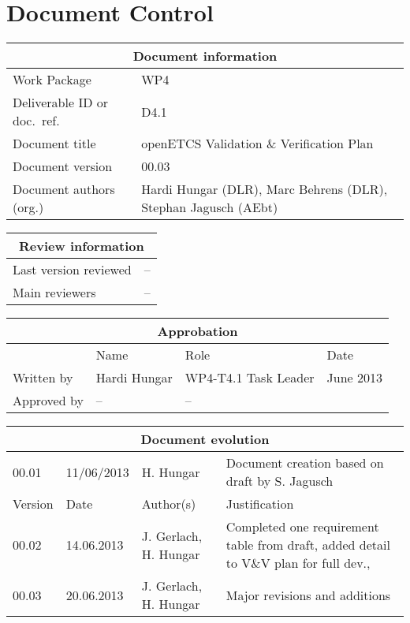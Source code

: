\documentclass{template/openetcs_report}
\begin{document}
\maketitle
\tableofcontents
\listoffiguresandtables
\newpage

\chapter{Document Control}

\begin{tabular}{|p{4.4cm}|p{8.7cm}|}
\hline
\multicolumn{2}{|c|}{Document information} \\
\hline
Work Package &  WP4  \\
Deliverable ID or doc.\ ref.\ & D4.1\\
\hline
Document title & openETCS Validation \& Verification Plan\\
Document version & 00.03 \\
Document authors (org.)  & Hardi Hungar (DLR), Marc Behrens (DLR),
Stephan Jagusch (AEbt) \\
\hline
\end{tabular}

\begin{tabular}{|p{4.4cm}|p{8.7cm}|}
\hline
\multicolumn{2}{|c|}{Review information} \\
\hline
Last version reviewed & -- \\
\hline
Main reviewers & -- \\
\hline
\end{tabular}

\begin{tabular}{|p{2.2cm}|p{4cm}|p{4cm}|p{2cm}|}
\hline
\multicolumn{4}{|c|}{Approbation} \\
\hline
  &  Name & Role & Date   \\
\hline  
Written by    &  Hardi Hungar & WP4-T4.1 Task Leader  &  June 2013\\
\hline
Approved by & -- & -- & \\
\hline
\end{tabular}

\begin{tabular}{|p{2.2cm}|p{2cm}|p{3cm}|p{5cm}|}
\hline
\multicolumn{4}{|c|}{Document evolution} \\
\hline
00.01 & 11/06/2013 & H. Hungar &  Document creation based on draft by
S. Jagusch\\
\hline
Version &  Date & Author(s) & Justification  \\
\hline  
00.02 & 14.06.2013 & J. Gerlach, H. Hungar &  Completed one
requirement table from draft, added detail to V\&V plan for full dev., \\
\hline  
00.03 & 20.06.2013 & J. Gerlach, H. Hungar & Major revisions and
additions
\\
\hline
\end{tabular}
\end{document}
